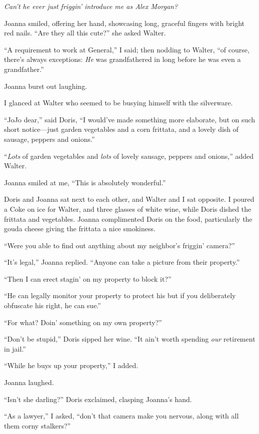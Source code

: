 \emph{Can't he ever just friggin' introduce me as Alex Morgan?}

Joanna smiled, offering her hand, showcasing long, graceful fingers with
bright red nails. ``Are they all this cute?'' she asked Walter.

``A requirement to work at General,'' I said; then nodding to Walter,
``of course, there's always exceptions: \emph{He} was grandfathered in
long before he was even a grandfather.''

Joanna burst out laughing.

I glanced at Walter who seemed to be busying himself with the
silverware.

``JoJo dear,'' said Doris, ``I would've made something more elaborate,
but on such short notice---just garden vegetables and a corn frittata,
and a lovely dish of sausage, peppers and onions.''

``\emph{Lots} of garden vegetables and \emph{lots} of lovely sausage,
peppers and onions,'' added Walter.

Joanna smiled at me, ``This is absolutely wonderful.''

Doris and Joanna sat next to each other, and Walter and I sat opposite.
I poured a Coke on ice for Walter, and three glasses of white wine,
while Doris dished the frittata and vegetables. Joanna complimented
Doris on the food, particularly the gouda cheese giving the frittata a
nice smokiness.

``Were you able to find out anything about my neighbor's friggin'
camera?''

``It's legal,'' Joanna replied. ``Anyone can take a picture from their
property.''

``Then I can erect stagin' on my property to block it?''

``He can legally monitor your property to protect his but if you
deliberately obfuscate his right, he can sue.''

``For what? Doin' something on my own property?''

``Don't be stupid,'' Doris sipped her wine. ``It ain't worth spending
\emph{our} retirement in jail.''

``While he buys up your property,'' I added.

Joanna laughed.

``Isn't she darling?'' Doris exclaimed, clasping Joanna's hand.

``As a lawyer,'' I asked, ``don't that camera make you nervous, along
with all them corny stalkers?''

